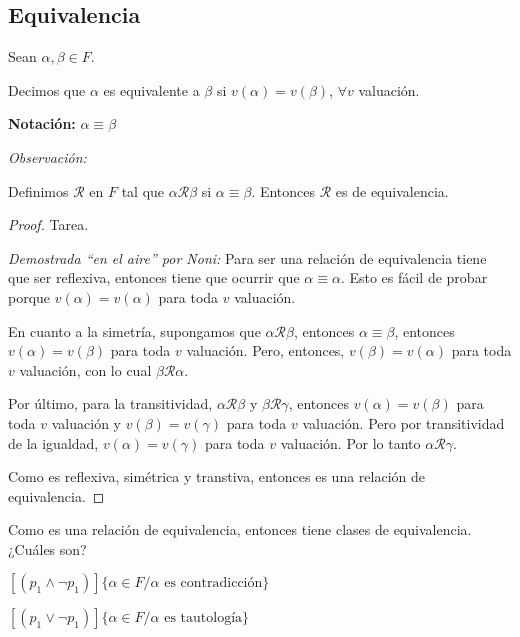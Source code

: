\subsection{Equivalencia}

\begin{definicion}{}{}
    Sean $\alpha, \beta \in F$.

    \medskip

    Decimos que $\alpha$ es equivalente a $\beta$ si $v(\alpha)=v(\beta)$, 
    $\forall v$ valuación.

    \bigskip
    \textbf{Notación:}
    \( \alpha \equiv \beta \)
\end{definicion}


\bigskip
\textit{Observación:}

Definimos $\mathcal{R}$ en $F$ tal que $\alpha \mathcal{R} \beta$
si $\alpha \equiv \beta$.
Entonces $\mathcal{R}$ es de equivalencia.

\begin{proof} \phantom{.}
    Tarea.

    \textit{Demostrada ``en el aire'' por Noni:}
    Para ser una relación de equivalencia tiene que ser reflexiva, entonces
    tiene que ocurrir que $\alpha \equiv \alpha$. Esto es fácil de probar
    porque $v(\alpha) = v(\alpha)$ para toda $v$ valuación.

    En cuanto a la simetría, supongamos que $\alpha \mathcal{R} \beta$, 
    entonces $\alpha \equiv \beta$, entonces $v(\alpha)=v(\beta)$ para toda
    $v$ valuación. Pero, entonces, $v(\beta)=v(\alpha)$ para toda $v$
    valuación, con lo cual $\beta \mathcal{R} \alpha$.

    Por último, para la transitividad, $\alpha \mathcal{R} \beta$ y
    $\beta \mathcal{R} \gamma$, entonces $v(\alpha) = v(\beta)$ para toda
    $v$ valuación y $v(\beta)=v(\gamma)$ para toda $v$ valuación. Pero por
    transitividad de la igualdad, $v(\alpha) = v(\gamma)$ para toda $v$
    valuación. Por lo tanto $\alpha \mathcal{R} \gamma$.

    Como es reflexiva, simétrica y transtiva, entonces es una relación de
    equivalencia.
\end{proof}


Como es una relación de equivalencia, entonces tiene clases de equivalencia.
¿Cuáles son?

$\left[ ( p_1 \wedge \neg p_1 )  \right] \{ \alpha\in F / 
\alpha \text{ es contradicción} \}$ 


$\left[ ( p_1 \vee \neg p_1 )  \right] \{ \alpha\in F / 
\alpha \text{ es tautología} \}$ 

